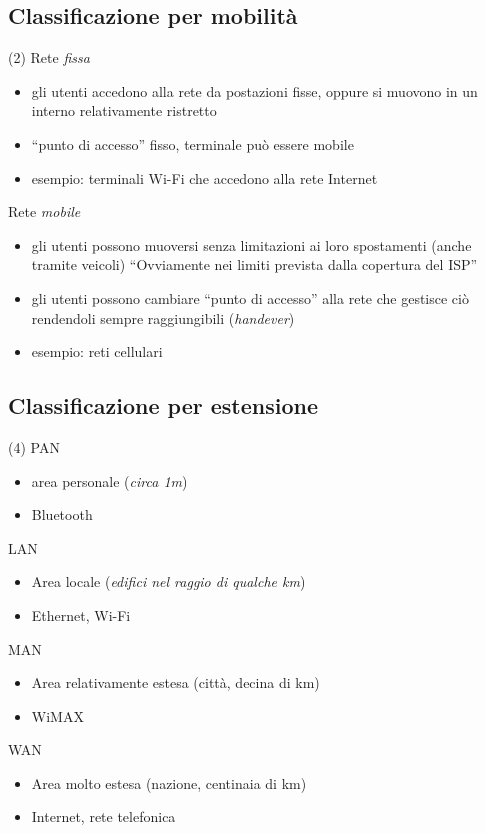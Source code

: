 \documentclass{book}
\begin{document}
\subsection{Classificazione per mobilità}
\begin{tasks}(2)
	\task Rete \textit{fissa}
	\begin{itemize}
		\item gli utenti accedono alla rete da postazioni fisse, oppure si
			muovono in un interno relativamente ristretto
		\item ``punto di accesso'' fisso, terminale può essere mobile
		\item esempio: terminali Wi-Fi che accedono alla rete Internet
	\end{itemize}
	\task Rete \textit{mobile}
	\begin{itemize}
		\item gli utenti possono muoversi senza limitazioni ai loro spostamenti
			(anche tramite veicoli) ``Ovviamente nei limiti prevista dalla
			copertura del ISP''
		\item gli utenti possono cambiare ``punto di accesso'' alla rete che
			gestisce ciò rendendoli sempre raggiungibili (\textit{handever})
		\item esempio: reti cellulari
	\end{itemize}
\end{tasks}
\subsection{Classificazione per estensione}
\begin{tasks}(4)
	\task PAN
	\begin{itemize}
		\item area personale (\textit{circa 1m})
		\item Bluetooth
	\end{itemize}
	\task LAN
	\begin{itemize}
		\item Area locale (\textit{edifici nel raggio di qualche km})
		\item Ethernet, Wi-Fi
	\end{itemize}
	\task MAN
	\begin{itemize}
		\item Area relativamente estesa (città, decina di km)
		\item WiMAX
	\end{itemize}
	\task WAN
	\begin{itemize}
		\item Area molto estesa (nazione, centinaia di km)
		\item Internet, rete telefonica
	\end{itemize}
\end{tasks}
\end{document}
